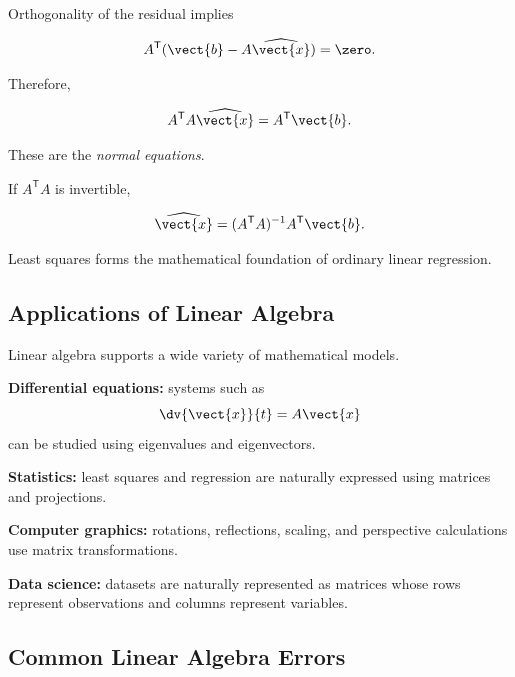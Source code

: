 Orthogonality of the residual implies

\[ A^{\mathsf T}
(\vect{b}-A\widehat{\vect{x}})=\zero. \]

Therefore,

\[ A^{\mathsf T}A\widehat{\vect{x}}
=
A^{\mathsf T}\vect{b}. \]

These are the \emph{normal equations}.

If \(A^{\mathsf T}A\) is invertible,

\[ \widehat{\vect{x}}
=
(A^{\mathsf T}A)^{-1}A^{\mathsf T}\vect{b}. \]

Least squares forms the mathematical foundation of ordinary linear regression.

\subsection{Applications of Linear Algebra}
\label{subsec:linear-algebra-applications}

Linear algebra supports a wide variety of mathematical models.

\begin{applicationbox}
\textbf{Differential equations:}
systems such as
\[ \dv{\vect{x}}{t}=A\vect{x} \]
can be studied using eigenvalues and eigenvectors.
\end{applicationbox}

\begin{applicationbox}
\textbf{Statistics:}
least squares and regression are naturally expressed using matrices and
projections.
\end{applicationbox}

\begin{applicationbox}
\textbf{Computer graphics:}
rotations, reflections, scaling, and perspective calculations use matrix
transformations.
\end{applicationbox}

\begin{applicationbox}
\textbf{Data science:}
datasets are naturally represented as matrices whose rows represent
observations and columns represent variables.
\end{applicationbox}

\subsection{Common Linear Algebra Errors}
\label{subsec:common-linear-algebra-errors}

